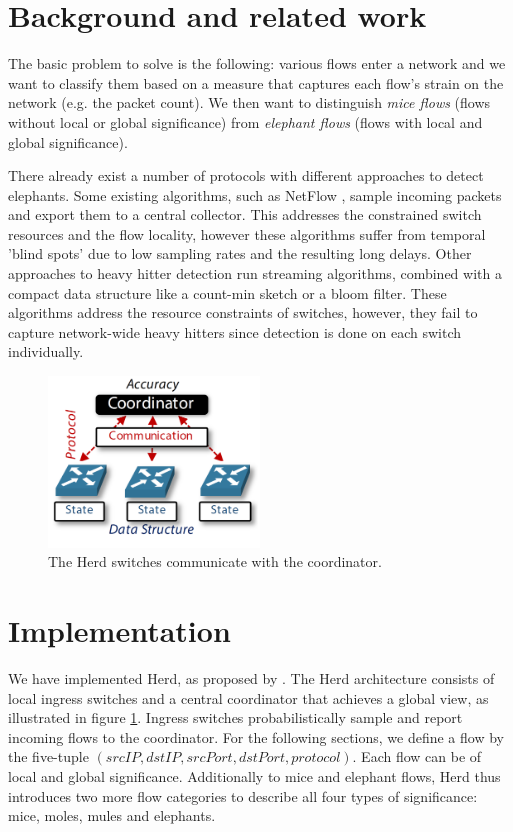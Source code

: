 \documentclass[11pt,oneside,a4paper]{article}
\begin{document}
\section{Background and related work}

The basic problem to solve is the following: various flows enter a network and we want to classify them based on a measure that captures each flow's strain on the network (e.g. the packet count). We then want to distinguish \textit{mice flows} (flows without local or global significance) from \textit{elephant flows} (flows with local and global significance).

\noindent There already exist a number of protocols with different approaches to detect elephants. Some existing algorithms, such as NetFlow \cite{claise2004cisco}, sample incoming packets and export them to a central collector. This addresses the constrained switch resources and the flow locality, however these algorithms suffer from temporal 'blind spots' due to low sampling rates and the resulting long delays. Other approaches to heavy hitter detection run streaming algorithms, combined with a compact data structure like a count-min sketch \cite{cormode2005improved} or a bloom filter. These algorithms address the resource constraints of switches, however, they fail to capture network-wide heavy hitters since detection is done on each switch individually.

\begin{figure}
	\centering
	\includegraphics[width=0.5\textwidth,scale=1]{figures/global_local_paper}
	\caption{The Herd switches communicate with the coordinator. \cite{anon2019herd}}
	\label{fig:global_fig}
\end{figure}

\section{Implementation}

We have implemented Herd, as proposed by \cite{anon2019herd}. The Herd architecture consists of local ingress switches and a central coordinator that achieves a global view, as illustrated in figure \ref{fig:global_fig}. Ingress switches probabilistically sample and report incoming flows to the coordinator. For the following sections, we define a flow by the five-tuple $(srcIP, dstIP, srcPort, dstPort, protocol)$. Each flow can be of local and global significance. Additionally to mice and elephant flows, Herd thus introduces two more flow categories to describe all four types of significance: mice, moles, mules and elephants.
\end{document}
